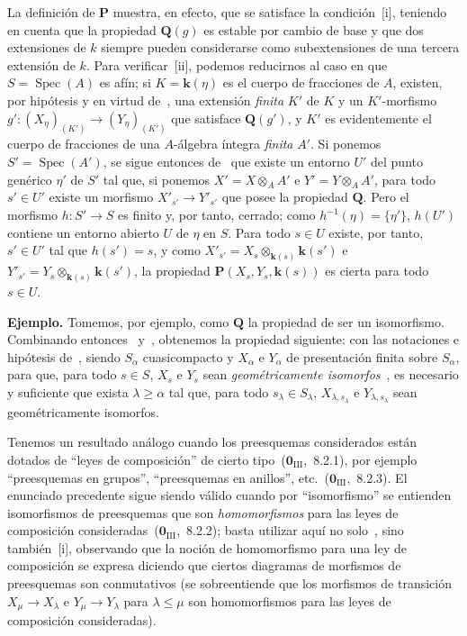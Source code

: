 La definición de $\boldsymbol{P}$ muestra, en efecto, que se satisface la condición~[i], teniendo en cuenta que la propiedad $\boldsymbol{Q}(g)$ es estable por cambio de base y que dos extensiones de $k$ siempre pueden considerarse como subextensiones de una tercera extensión de $k$.
Para verificar~[ii], podemos reducirnos al caso en que $S=\operatorname{Spec}(A)$ es afín; si $K=\boldsymbol{k}(\eta)$ es el cuerpo de fracciones de $A$, existen, por hipótesis y en virtud de~, una extensión \emph{finita} $K'$ de $K$ y un $K'$-morfismo $g':(X_\eta)_{(K')}\to(Y_\eta)_{(K')}$ que satisface $\boldsymbol{Q}(g')$, y $K'$ es evidentemente el cuerpo de fracciones de una $A$-álgebra íntegra \emph{finita} $A'$.
Si ponemos $S'=\operatorname{Spec}(A')$, se sigue entonces de~ que existe un entorno $U'$ del punto genérico $\eta'$ de $S'$ tal que, si ponemos $X'=X\otimes_A A'$ e $Y'=Y\otimes_A A'$, para todo $s'\in U'$ existe un morfismo $X'_{s'}\to Y'_{s'}$ que posee la propiedad $\boldsymbol{Q}$.
Pero el morfismo $h:S'\to S$ es finito y, por tanto, cerrado; como $h^{-1}(\eta)=\{\eta'\}$, $h(U')$ contiene un entorno abierto $U$ de $\eta$ en $S$.
Para todo $s\in U$ existe, por tanto, $s'\in U'$ tal que $h(s')=s$, y como $X'_{s'}=X_s\otimes_{\mathbf{k}(s)}\boldsymbol{k}(s')$ e $Y'_{s'}=Y_s\otimes_{\mathbf{k}(s)}\boldsymbol{k}(s')$, la propiedad $\boldsymbol{P}(X_s,Y_s,\boldsymbol{k}(s))$ es cierta para todo $s\in U$.

\begin{env}[9.3.6]
\label{IV.9.3.6}
\textbf{Ejemplo.}
Tomemos, por ejemplo, como $\boldsymbol{Q}$ la propiedad de ser un isomorfismo.
Combinando entonces~ y~, obtenemos la propiedad siguiente: con las notaciones e hipótesis de~, siendo $S_\alpha$ cuasicompacto y $X_\alpha$ e $Y_\alpha$ de presentación finita sobre $S_\alpha$, para que, para todo $s\in S$, $X_s$ e $Y_s$ sean \emph{geométricamente isomorfos}~, es necesario y suficiente que exista $\lambda\geqslant\alpha$ tal que, para todo $s_\lambda\in S_\lambda$, $X_{\lambda,s_\lambda}$ e $Y_{\lambda,s_\lambda}$ sean geométricamente isomorfos.
\end{env}

Tenemos un resultado análogo cuando los preesquemas considerados están dotados de ``leyes de composición'' de cierto tipo~($\mathbf{0}_{\mathrm{III}}$,~8.2.1), por ejemplo ``preesquemas en grupos'', ``preesquemas en anillos'', etc.~($\mathbf{0}_{\mathrm{III}}$,~8.2.3).
El enunciado precedente sigue siendo válido cuando por ``isomorfismo'' se entienden isomorfismos de preesquemas que son \emph{homomorfismos} para las leyes de composición consideradas~($\mathbf{0}_{\mathrm{III}}$,~8.2.2); basta utilizar aquí no solo~, sino también~[i], observando que la noción de homomorfismo para una ley de composición se expresa diciendo que ciertos diagramas de morfismos de preesquemas son conmutativos (se sobreentiende que los morfismos de transición $X_\mu\to X_\lambda$ e $Y_\mu\to Y_\lambda$ para $\lambda\leqslant\mu$ son homomorfismos para las leyes de composición consideradas).

